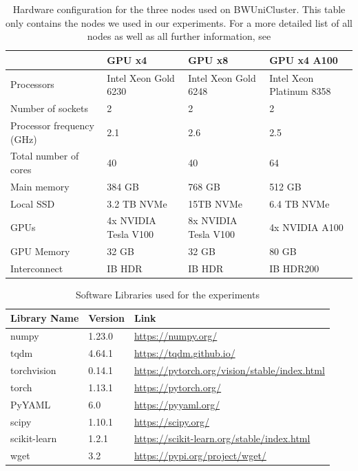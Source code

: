\begin{table}[h!]
    \begin{tabularx}{\textwidth}{|X | X X X|} 
        \hline
         & GPU x4 & GPU x8 & GPU x4 A100 \\ 
        \hline 
        Processors & Intel Xeon Gold 6230 & Intel Xeon Gold 6248 & Intel Xeon Platinum 8358  \\ 
        Number of sockets & 2 & 2 & 2  \\ 
        Processor frequency (GHz) & 2.1 & 2.6 & 2.5  \\ 
        Total number of cores & 40 & 40 & 64  \\ 
        Main memory & 384 GB & 768 GB & 512 GB  \\ 
        Local SSD & 3.2 TB NVMe & 15TB NVMe & 6.4 TB NVMe  \\ 
        GPUs & 4x NVIDIA Tesla V100 & 8x NVIDIA Tesla V100 & 4x NVIDIA A100  \\ 
        GPU Memory & 32 GB  & 32 GB & 80 GB  \\ 
        Interconnect & IB HDR & IB HDR & IB HDR200  \\ 
        \hline
    \end{tabularx}
    \caption{Hardware configuration for the three nodes used on BWUniCluster. This table only contains
    the nodes we used in our experiments. For a more detailed list of all nodes as well as all further
    information, see \cite{bwUniclusterHardware}}
    \label{fig:HardwareSpec}
\end{table}

\begin{table}[h!]
    \centering
    \begin{tabular}{|l | l l |} 
        \hline
        Library Name & Version & Link \\ 
        \hline 
        numpy & 1.23.0 & \url{https://numpy.org/} \\
        tqdm & 4.64.1 & \url{https://tqdm.github.io/}  \\
        torchvision & 0.14.1 & \url{https://pytorch.org/vision/stable/index.html} \\ 
        torch & 1.13.1 & \url{https://pytorch.org/} \\
        PyYAML & 6.0 & \url{https://pyyaml.org/} \\
        scipy & 1.10.1 & \url{https://scipy.org/} \\
        scikit-learn & 1.2.1 & \url{https://scikit-learn.org/stable/index.html} \\
        wget & 3.2 & \url{https://pypi.org/project/wget/} \\
        \hline
    \end{tabular}
    \caption{Software Libraries used for the experiments}
    \label{fig:Libraries}
\end{table}

